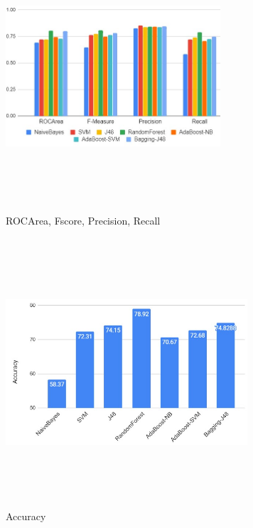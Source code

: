 \documentclass[10pt,conference]{IEEEtran}
\begin{document}
\begin{figure}[htbp]
\centerline{\includegraphics[width=8cm,height=10cm,keepaspectratio]{Screenshot_11.jpg}}
\caption{ROCArea, Fscore, Precision, Recall}
\label{fig}
\end{figure}

\begin{figure}[htbp]
\centerline{\includegraphics[width=9cm,height=10cm,keepaspectratio]{Screenshot_22.jpg}}
\caption{Accuracy}
\label{fig}
\end{figure}
\end{document}
